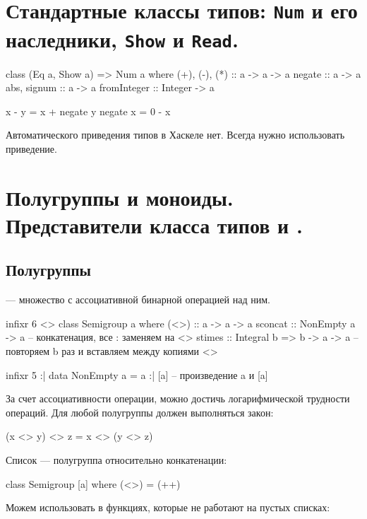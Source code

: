\documentclass[11pt,a4paper]{article}
\begin{document}
\section{Стандартные классы типов: \texttt{Num} и его наследники, \texttt{Show} и \texttt{Read}.}
\begin{hscode}
class (Eq a, Show a) => Num a where
  (+), (-), (*) :: a -> a -> a
  negate        :: a -> a
  abs, signum   :: a -> a
  fromInteger   :: Integer -> a

  x - y = x + negate y
  negate x = 0 - x
\end{hscode}

Автоматического приведения типов в Хаскеле нет. Всегда нужно использовать приведение.


\section{Полугруппы и моноиды. Представители класса типов  и .}
\subsection{Полугруппы}
 --- множество с ассоциативной бинарной операцией над ним.
\begin{hscode}
infixr 6 <>
class Semigroup a where
  (<>) :: a -> a -> a
  sconcat :: NonEmpty a -> a  -- конкатенация, все : заменяем на <>
  stimes :: Integral b => b -> a -> a  -- повторяем b раз и вставляем между копиями <>

infixr 5 :|
data NonEmpty a = a :| [a]  -- произведение a и [a]
\end{hscode}
За счет ассоциативности операции, можно достичь логарифмической трудности операций.
Для любой полугруппы должен выполняться закон:
\begin{hscode}
(x <> y) <> z = x <> (y <> z)
\end{hscode}
Список --- полугруппа относительно конкатенации:
\begin{hscode}
class Semigroup [a] where
  (<>) = (++)
\end{hscode}
Можем использовать в функциях, которые не работают на пустых списках:
\end{document}
